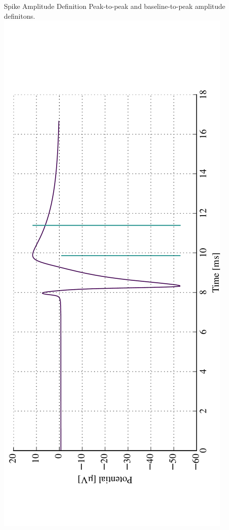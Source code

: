 \documentclass{beamer}
\begin{document}
\begin{frame}{Spike Amplitude Definition}
    Peak-to-peak and baseline-to-peak amplitude definitons.
    \centering
    \includegraphics[angle=-90,width=\textwidth]{images/amp_def.pdf}
\end{frame}
\end{document}
